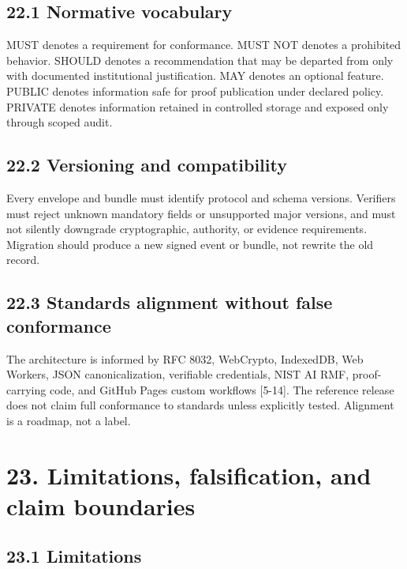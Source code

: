 \subsection{22.1 Normative vocabulary}\label{normative-vocabulary}

MUST denotes a requirement for conformance. MUST NOT denotes a
prohibited behavior. SHOULD denotes a recommendation that may be
departed from only with documented institutional justification. MAY
denotes an optional feature. PUBLIC denotes information safe for proof
publication under declared policy. PRIVATE denotes information retained
in controlled storage and exposed only through scoped audit.

\subsection{22.2 Versioning and
compatibility}\label{versioning-and-compatibility}

Every envelope and bundle must identify protocol and schema versions.
Verifiers must reject unknown mandatory fields or unsupported major
versions, and must not silently downgrade cryptographic, authority, or
evidence requirements. Migration should produce a new signed event or
bundle, not rewrite the old record.

\subsection{22.3 Standards alignment without false
conformance}\label{standards-alignment-without-false-conformance}

The architecture is informed by RFC 8032, WebCrypto, IndexedDB, Web
Workers, JSON canonicalization, verifiable credentials, NIST AI RMF,
proof-carrying code, and GitHub Pages custom workflows {[}5-14{]}. The
reference release does not claim full conformance to standards unless
explicitly tested. Alignment is a roadmap, not a label.

\section{23. Limitations, falsification, and claim
boundaries}\label{limitations-falsification-and-claim-boundaries}

\subsection{23.1 Limitations}\label{limitations}

